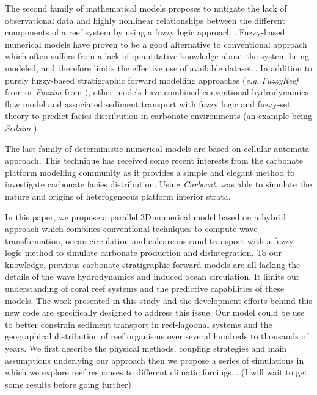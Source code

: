 \documentclass[default,jgrga]{agutex2015}
\begin{document}
\begin{article}
\noindent The second family of mathematical models proposes to mitigate the lack of observational data and highly nonlinear relationships between the different components of a reef system by using a fuzzy logic approach \citep{Meesters98}. Fuzzy-based numerical models have proven to be a good alternative to conventional approach which often suffers from a lack of quantitative knowledge about the system being modeled, and therefore limits the effective use of available dataset \citep{Parcell98}. In addition to purely fuzzy-based stratigraphic forward modelling approaches (\textit{e.g.} \textit{FuzzyReef} from \citet{Parcell03} or \textit{Fuzzim} from \citet{Nordlund99}), other models have combined conventional hydrodynamics flow model and associated sediment transport with fuzzy logic and fuzzy-set theory to predict facies distribution in carbonate environments (an example being \textit{Sedsim} \citep{Griffiths01, Salles11}).

\noindent The last family of deterministic numerical models are based on cellular automata approach. This technique has received some recent interests from the carbonate platform modelling community as it provides a simple and elegant method to investigate carbonate facies distribution. Using \textit{Carbocat}, \citet{Burgess13} was able to simulate the nature and origins of heterogeneous platform interior strata.

\noindent In this paper, we propose a parallel 3D numerical model based on a hybrid approach which combines conventional techniques to compute wave transformation, ocean circulation and calcareous sand transport with a fuzzy logic method to simulate carbonate production and disintegration. To our knowledge, previous carbonate stratigraphic forward models are all lacking the details of the wave hydrodynamics and induced ocean circulation. It limits our understanding of coral reef systems and the predictive capabilities of these models. The work presented in this study and the development efforts behind this new code are specifically designed to address this issue. Our model could be use to better constrain sediment transport in reef-lagoonal systems and the geographical distribution of reef organisms over several hundreds to thousands of years. We first describe the physical methods, coupling strategies and main assumptions underlying our approach then we propose a series of simulations in which we explore reef responses to different climatic forcings... (I will wait to get some results before going further)


\end{article}
\end{document}
